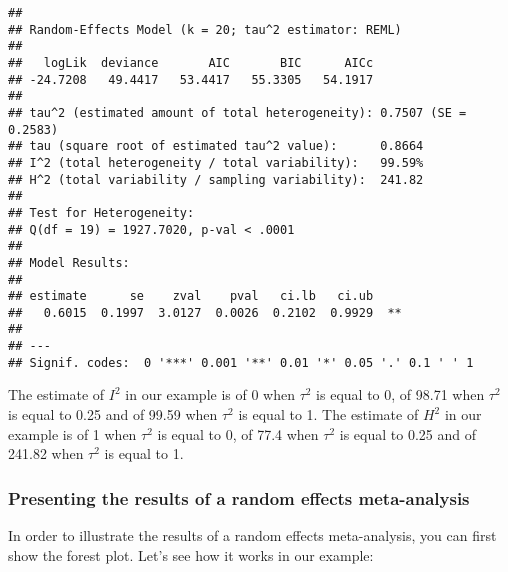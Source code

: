 \documentclass[]{book}
\theoremstyle{definition}
\theoremstyle{definition}
\theoremstyle{definition}
\theoremstyle{remark}
\begin{document}
\begin{verbatim}
## 
## Random-Effects Model (k = 20; tau^2 estimator: REML)
## 
##   logLik  deviance       AIC       BIC      AICc  
## -24.7208   49.4417   53.4417   55.3305   54.1917  
## 
## tau^2 (estimated amount of total heterogeneity): 0.7507 (SE = 0.2583)
## tau (square root of estimated tau^2 value):      0.8664
## I^2 (total heterogeneity / total variability):   99.59%
## H^2 (total variability / sampling variability):  241.82
## 
## Test for Heterogeneity: 
## Q(df = 19) = 1927.7020, p-val < .0001
## 
## Model Results:
## 
## estimate      se    zval    pval   ci.lb   ci.ub    
##   0.6015  0.1997  3.0127  0.0026  0.2102  0.9929  **
## 
## ---
## Signif. codes:  0 '***' 0.001 '**' 0.01 '*' 0.05 '.' 0.1 ' ' 1
\end{verbatim}

The estimate of \(I^2\) in our example is of 0 when \(\tau^2\) is equal
to 0, of 98.71 when \(\tau^2\) is equal to 0.25 and of 99.59 when
\(\tau^2\) is equal to 1. The estimate of \(H^2\) in our example is of 1
when \(\tau^2\) is equal to 0, of 77.4 when \(\tau^2\) is equal to 0.25
and of 241.82 when \(\tau^2\) is equal to 1.

\subsubsection{Presenting the results of a random effects
meta-analysis}\label{presenting-the-results-of-a-random-effects-meta-analysis}

In order to illustrate the results of a random effects meta-analysis,
you can first show the forest plot. Let's see how it works in our
example:
\end{document}
